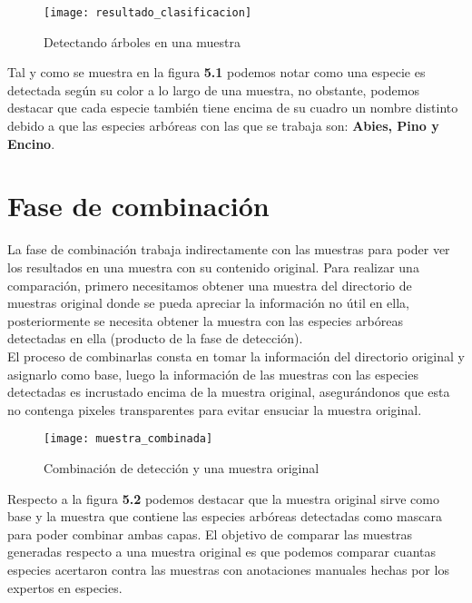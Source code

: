 \begin{figure}[H]
  \centering
  \begin{minipage}[b]{0.8\textwidth}
        \texttt{[image: resultado\_clasificacion]}
    \caption{Detectando árboles en una muestra}
  \end{minipage}
\end{figure}

Tal y como se muestra en la figura \textbf{5.1}  podemos notar como una especie es detectada según su color a lo largo de una muestra, no obstante, podemos destacar que cada especie también tiene encima de su cuadro un nombre distinto debido a que las especies arbóreas con las que se trabaja son: \textbf{Abies, Pino y Encino}. 

\section{Fase de combinación}
La fase de combinación trabaja indirectamente con las muestras para poder ver los resultados en una muestra con su contenido original. Para realizar una comparación, primero necesitamos obtener una muestra del directorio de muestras original donde se pueda apreciar la información no útil en ella, posteriormente se necesita obtener la muestra con las especies arbóreas detectadas en ella (producto de la fase de detección).\\ 

El proceso de combinarlas consta en tomar la información del directorio original y asignarlo como base, luego la información de las muestras con las especies detectadas es incrustado encima de la muestra original, asegurándonos que esta no contenga pixeles transparentes para evitar ensuciar la muestra original.

\begin{figure}[H]
  \centering
  \begin{minipage}[b]{0.8\textwidth}
        \texttt{[image: muestra\_combinada]}
    \caption{Combinación de detección y una muestra original}
  \end{minipage}
\end{figure}

Respecto a la figura \textbf{5.2} podemos destacar que la muestra original sirve como base y la muestra que contiene las especies arbóreas detectadas como mascara para poder combinar ambas capas. El objetivo de comparar las muestras generadas respecto a una muestra original es que podemos comparar cuantas especies acertaron contra las muestras con anotaciones manuales hechas por los expertos en especies.

